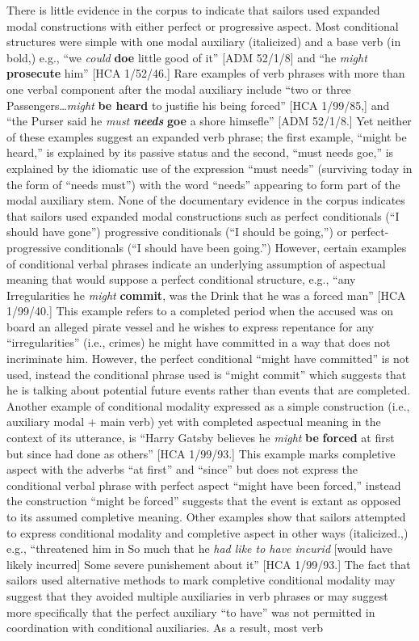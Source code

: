 \begin{styleStandard}
There is little evidence in the corpus to indicate that sailors used expanded modal constructions with either perfect or progressive aspect. Most conditional structures were simple with one modal auxiliary (italicized) and a base verb (in bold,) e.g., “we \textit{could} \textbf{doe }little good of it” [ADM 52/1/8] and “he \textit{might} \textbf{prosecute} him” [HCA 1/52/46.] Rare examples of verb phrases with more than one verbal component after the modal auxiliary include “two or three Passengers…\textit{might} \textbf{be heard} to justifie his being forced” [HCA 1/99/85,] and “the Purser said he \textit{must} \textbf{\textit{needs}}\textbf{ goe} a shore himsefle” [ADM 52/1/8.] Yet neither of these examples suggest an expanded verb phrase; the first example, “might be heard,” is explained by its passive status and the second, “must needs goe,” is explained by the idiomatic use of the expression “must needs” (surviving today in the form of “needs must”) with the word “needs” appearing to form part of the modal auxiliary stem. None of the documentary evidence in the corpus indicates that sailors used expanded modal constructions such as perfect conditionals (“I should have gone”) progressive conditionals (“I should be going,”) or perfect-progressive conditionals (“I should have been going.”) However, certain examples of conditional verbal phrases indicate an underlying assumption of aspectual meaning that would suppose a perfect conditional structure, e.g., “any Irregularities he \textit{might} \textbf{commit}, was the Drink that he was a forced man” [HCA 1/99/40.] This example refers to a completed period when the accused was on board an alleged pirate vessel and he wishes to express repentance for any “irregularities” (i.e., crimes) he might have committed in a way that does not incriminate him. However, the perfect conditional “might have committed” is not used, instead the conditional phrase used is “might commit” which suggests that he is talking about potential future events rather than events that are completed. Another example of conditional modality expressed as a simple construction (i.e., auxiliary modal + main verb) yet with completed aspectual meaning in the context of its utterance, is “Harry Gatsby believes he \textit{might }\textbf{be} \textbf{forced} at first but since had done as others” [HCA 1/99/93.] This example marks completive aspect with the adverbs “at first” and “since” but does not express the conditional verbal phrase with perfect aspect “might have been forced,” instead the construction “might be forced” suggests that the event is extant as opposed to its assumed completive meaning. Other examples show that sailors attempted to express conditional modality and completive aspect in other ways (italicized.,) e.g., “threatened him in So much that he \textit{had like to have incurid} [would have likely incurred] Some severe punishement about it” [HCA 1/99/93.] The fact that sailors used alternative methods to mark completive conditional modality may suggest that they avoided multiple auxiliaries in verb phrases or may suggest more specifically that the perfect auxiliary “to have” was not permitted in coordination with conditional auxiliaries. As a result, most verb 
\end{styleStandard}
